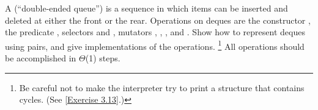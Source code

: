 \begin{exercise}
	\label{Exercise 3.23}
		A  (“double-ended queue”) is a sequence in which items can be inserted and deleted at either the front or the rear.
		Operations on deques are the constructor , the predicate , selectors  and , mutators , , , and .
		Show how to represent deques using pairs, and give implementations of the operations.%
	\footnote{
		Be careful not to make the interpreter try to print a structure that contains cycles.
		(See \cref{Exercise 3.13}.)
	}
	All operations should be accomplished in \( Θ \)(1) steps.
\end{exercise}
